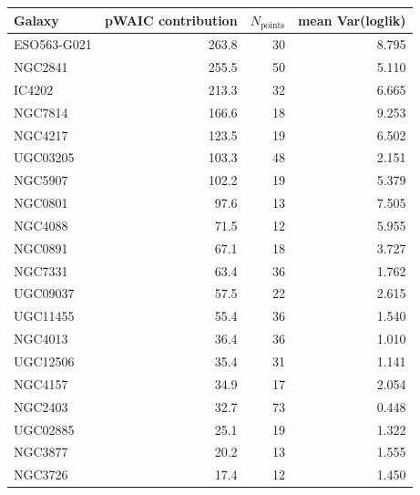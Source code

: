 \begin{tabular}{lrrr}
\toprule
Galaxy & pWAIC contribution & $N_{\mathrm{points}}$ & mean Var(loglik) \\
\midrule
ESO563-G021 & 263.8 & 30 & 8.795 \\
NGC2841 & 255.5 & 50 & 5.110 \\
IC4202 & 213.3 & 32 & 6.665 \\
NGC7814 & 166.6 & 18 & 9.253 \\
NGC4217 & 123.5 & 19 & 6.502 \\
UGC03205 & 103.3 & 48 & 2.151 \\
NGC5907 & 102.2 & 19 & 5.379 \\
NGC0801 & 97.6 & 13 & 7.505 \\
NGC4088 & 71.5 & 12 & 5.955 \\
NGC0891 & 67.1 & 18 & 3.727 \\
NGC7331 & 63.4 & 36 & 1.762 \\
UGC09037 & 57.5 & 22 & 2.615 \\
UGC11455 & 55.4 & 36 & 1.540 \\
NGC4013 & 36.4 & 36 & 1.010 \\
UGC12506 & 35.4 & 31 & 1.141 \\
NGC4157 & 34.9 & 17 & 2.054 \\
NGC2403 & 32.7 & 73 & 0.448 \\
UGC02885 & 25.1 & 19 & 1.322 \\
NGC3877 & 20.2 & 13 & 1.555 \\
NGC3726 & 17.4 & 12 & 1.450 \\
\bottomrule
\end{tabular}